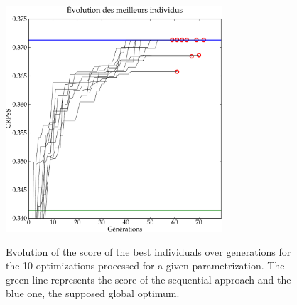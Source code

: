 \documentclass[twocol]{ametsoc}
\begin{document}
\begin{figure}[htb]
	\begin{center}
		\noindent\includegraphics[width=19pc,angle=0]{figures/gas_evolution_good.pdf}\\
	\end{center}
	\caption{Evolution of the score of the best individuals over generations for the 10 optimizations processed for a given parametrization. The green line represents the score of the sequential approach and the blue one, the supposed global optimum.}
	\label{fig:gas_evolution_good}
\end{figure}
\end{document}

